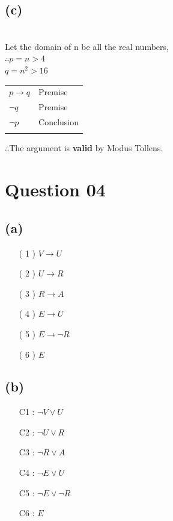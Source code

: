 \documentclass[a4paper,12pt]{article}
\begin{document}
\subsection{(c)}
\,\\
Let the domain of n be all the real numbers,\\
\hspace*{0.7cm}$\therefore p = n > 4$\\
\hspace*{1cm}$q = n^2 > 16$\\

\begin{tabular}{ll}
$p \rightarrow q$ & Premise\\
$\neg q$ & Premise\\
\hline
$\neg p$ & Conclusion\\\\
\end{tabular}

$\therefore$The argument is \textbf{valid} by Modus Tollens.

\newpage
\section{Question 04}
\subsection{(a)}
\begin{itemize}
    \item[( 1 ) ] $V \rightarrow U$
    \item[( 2 ) ] $U \rightarrow R$
    \item[( 3 ) ] $R \rightarrow A$
    \item[( 4 ) ] $E \rightarrow U$
    \item[( 5 ) ] $E \rightarrow \neg R$
    \item[( 6 ) ] $E$
\end{itemize}

\subsection{(b)}
\begin{itemize}
    \item[C1 :] $\neg V \lor U$
    \item[C2 :] $\neg U \lor R$
    \item[C3 :] $\neg R \lor A$
    \item[C4 :] $\neg E \lor U$
    \item[C5 :] $\neg E \lor \neg R$
    \item[C6 :] $E$
\end{itemize}
\end{document}
